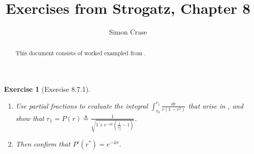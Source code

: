 \documentclass[]{article}
\title{Exercises from Strogatz, Chapter 8}
\author{Simon Crase}
\newtheorem{ex}{Exercise}
\begin{document}
\maketitle

\begin{abstract}
This document consists of worked exampled from \cite[Chapter 8]{strogatz:2000}.
\end{abstract}

\begin{ex}[Exercise 8.7.1]
	\begin{enumerate}
		\item Use partial fractions to evaluate the integral $\int_{r_0}^{r_1}\frac{dr}{r(1-r^2)}$ that arise in \cite[Example 8.7.1]{strogatz:2000}, and show that $r_1=P(r)\triangleq\frac{1}{\sqrt{1+e^{-4\pi}(\frac{1}{r_0^2}-1)}}$.\label{item:8.7.1.1}
		\item  Then confirm that $P'(r^*)=e^{-4\pi}$.\label{8.7.1.2}
	\end{enumerate}
\end{ex}
\end{document}
